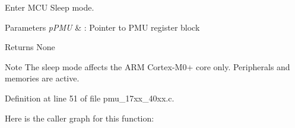 Enter M\+CU Sleep mode. 


\begin{DoxyParams}{Parameters}
{\em p\+P\+MU} & \+: Pointer to P\+MU register block \\
\hline
\end{DoxyParams}
\begin{DoxyReturn}{Returns}
None 
\end{DoxyReturn}
\begin{DoxyNote}{Note}
The sleep mode affects the A\+RM Cortex-\/\+M0+ core only. Peripherals and memories are active. 
\end{DoxyNote}


Definition at line 51 of file pmu\+\_\+17xx\+\_\+40xx.\+c.



Here is the caller graph for this function\+:


